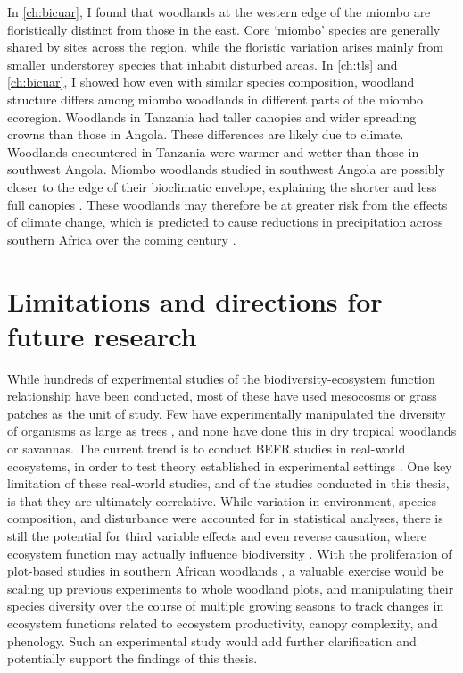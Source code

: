\begin{refsection}
In \autoref{ch:bicuar}, I found that woodlands at the western edge of the miombo are floristically distinct from those in the east. Core `miombo' species are generally shared by sites across the region, while the floristic variation arises mainly from smaller understorey species that inhabit disturbed areas. In \autoref{ch:tls} and \autoref{ch:bicuar}, I showed how even with similar species composition, woodland structure differs among miombo woodlands in different parts of the miombo ecoregion. Woodlands in Tanzania had taller canopies and wider spreading crowns than those in Angola. These differences are likely due to climate. Woodlands encountered in Tanzania were warmer and wetter than those in southwest Angola. Miombo woodlands studied in southwest Angola are possibly closer to the edge of their bioclimatic envelope, explaining the shorter and less full canopies \citep{Scholes2002}. These woodlands may therefore be at greater risk from the effects of climate change, which is predicted to cause reductions in precipitation across southern Africa over the coming century \citep{Kusangaya2014}.

\section{Limitations and directions for future research}
\label{discussion:sec:future}

While hundreds of experimental studies of the biodiversity-ecosystem function relationship have been conducted, most of these have used mesocosms or grass patches as the unit of study. Few have experimentally manipulated the diversity of organisms as large as trees \citep{Huang2018}, and none have done this in dry tropical woodlands or savannas. The current trend is to conduct BEFR studies in real-world ecosystems, in order to test theory established in experimental settings \citep{Plas2019}. One key limitation of these real-world studies, and of the studies conducted in this thesis, is that they are ultimately correlative. While variation in environment, species composition, and disturbance were accounted for in statistical analyses, there is still the potential for third variable effects and even reverse causation, where ecosystem function may actually influence biodiversity \citep{Eisenhauer2016}. With the proliferation of plot-based studies in southern African woodlands \citep{Ryan2020}, a valuable exercise would be scaling up previous experiments to whole woodland plots, and manipulating their species diversity over the course of multiple growing seasons to track changes in ecosystem functions related to ecosystem productivity, canopy complexity, and phenology. Such an experimental study would add further clarification and potentially support the findings of this thesis.


\end{refsection}
